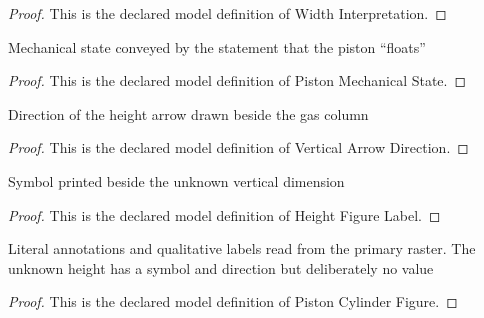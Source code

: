 \begin{proof}
  This is the declared model definition of Width Interpretation.
\end{proof}
\begin{definition}
  \label{def:physics:phyx-mini-0374:phyxminiproblems-problemphyxmini0374-pistonmechanicalstate}
  Mechanical state conveyed by the statement that the piston “floats”
\end{definition}
\begin{proof}
  This is the declared model definition of Piston Mechanical State.
\end{proof}
\begin{definition}
  \label{def:physics:phyx-mini-0374:phyxminiproblems-problemphyxmini0374-verticalarrowdirection}
  Direction of the height arrow drawn beside the gas column
\end{definition}
\begin{proof}
  This is the declared model definition of Vertical Arrow Direction.
\end{proof}
\begin{definition}
  \label{def:physics:phyx-mini-0374:phyxminiproblems-problemphyxmini0374-heightfigurelabel}
  Symbol printed beside the unknown vertical dimension
\end{definition}
\begin{proof}
  This is the declared model definition of Height Figure Label.
\end{proof}
\begin{definition}
  \label{def:physics:phyx-mini-0374:phyxminiproblems-problemphyxmini0374-pistoncylinderfigure}
  Literal annotations and qualitative labels read from the primary raster. The unknown height has a symbol and direction but deliberately no value
\end{definition}
\begin{proof}
  This is the declared model definition of Piston Cylinder Figure.
\end{proof}
